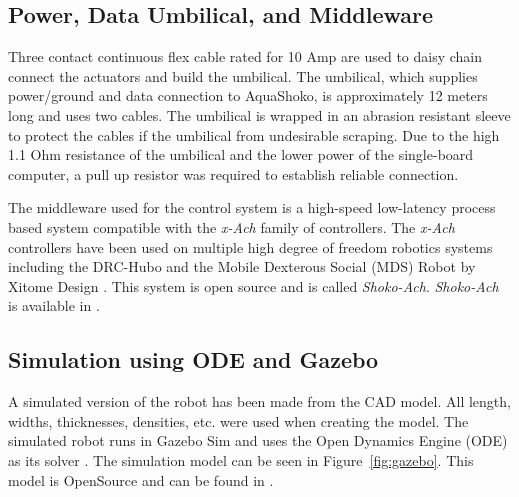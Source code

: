 \subsection{Power, Data Umbilical, and Middleware}
Three contact continuous flex cable rated for 10 Amp are used to daisy chain connect the actuators and build the umbilical. %
The umbilical, which supplies power/ground and data connection to AquaShoko, is approximately 12 meters long and uses two cables. The umbilical is wrapped in an abrasion resistant sleeve to protect the cables if the umbilical from undesirable scraping. Due to the high 1.1 Ohm resistance of the umbilical and the lower power of the single-board computer, a pull up resistor was required to establish reliable connection. 

The middleware used for the control system is a high-speed low-latency process based system compatible with the \textit{x-Ach} family of controllers.  The \textit{x-Ach} controllers have been used on multiple high degree of freedom robotics systems including the DRC-Hubo and the Mobile Dexterous Social (MDS) Robot by Xitome Design \cite{lofaro-2015-ieee-ram-hubo-ach,lofaro-2018-ieee-amc-legacy-robots}.
This system is open source and is called \textit{Shoko-Ach}.
\textit{Shoko-Ach} is available in \cite{shokoACH}. 


\subsection{Simulation using ODE and Gazebo}
A simulated version of the robot has been made from the CAD model.
All length, widths, thicknesses, densities, etc. were used when creating the model.
The simulated robot runs in Gazebo Sim \cite{gazebo} and uses the Open Dynamics Engine (ODE) as its solver \cite{ode:2008}.
The simulation model can be seen in Figure~\ref{fig:gazebo}.
This model is OpenSource and can be found in \cite{AquashokoGazebo}.






